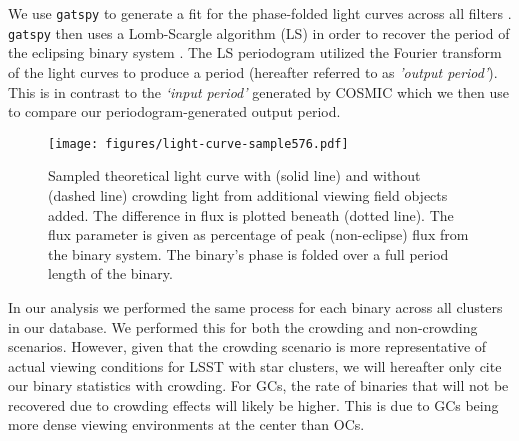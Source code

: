 \documentclass[twocolumn]{aastex63}
\begin{document}
 We use \texttt{gatspy} to generate a fit for the phase-folded light curves across all filters \citep{2016ascl.soft10007V}. \texttt{gatspy} then uses a Lomb-Scargle algorithm (LS) in order to recover the period of the eclipsing binary system \citep{2015ApJ...812...18V}. The LS periodogram utilized the Fourier transform of the light curves to produce a period (hereafter referred to as \textit{'output period'}). This is in contrast to the \textit{‘input period’} generated by COSMIC which we then use to compare our periodogram-generated output period. 

\begin{figure}
    \centering
    \texttt{[image: figures/light-curve-sample576.pdf]}
    \caption{Sampled theoretical light curve with (solid line) and without (dashed line) crowding light from additional viewing field objects added. The difference in flux is plotted beneath (dotted line). The flux parameter is given as percentage of peak (non-eclipse) flux from the binary system. The binary's phase is folded over a full period length of the binary.}
    \label{fig:light3curve}
\end{figure}

In our analysis we performed the same process for each binary across all clusters in our database. We performed this for both the crowding and non-crowding scenarios. However, given that the crowding scenario is more representative of actual viewing conditions for LSST with star clusters, we will hereafter only cite our binary statistics with crowding. For GCs, the rate of binaries that will not be recovered due to crowding effects will likely be higher. This is due to GCs being more dense viewing environments at the center than OCs.


\end{document}
